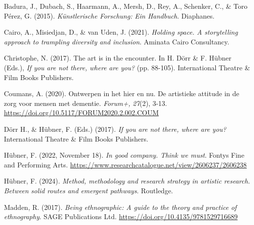 \documentclass[authordate, empirical,issue]{jote-new-article}
\begin{document}
	{

	Badura, J., Dubach, S., Haarmann, A., Mersh, D., Rey, A., Schenker, C., \& Toro Pérez, G. (2015). \emph{Künstlerische Forschung: Ein Handbuch}. Diaphanes.







	Cairo, A., Misiedjan, D., \& van Uden, J. (2021). \emph{Holding space. A storytelling approach to trampling diversity and inclusion}. Aminata Cairo Consultancy.







	Christophe, N. (2017). The art is in the encounter. In H. Dörr \& F. Hübner (Eds.), \emph{If you are not there, where are you?} (pp. 88-105). International Theatre \& Film Books Publishers.







	Coumans, A. (2020). Ontwerpen in het hier en nu. De artistieke attitude in de zorg voor mensen met dementie. \emph{Forum+,} \emph{27}(2), 3-13. \url{https://doi.org/10.5117/FORUM2020.2.002.COUM}







	Dörr H., \& Hübner, F. (Eds.) (2017). \emph{If you are not there, where are you?} International Theatre \& Film Books Publishers.







	Hübner, F. (2022, November 18). \emph{In good company. Think we must}. Fontys Fine and Performing Arts. \url{https://www.researchcatalogue.net/view/2606237/2606238}







	Hübner, F. (2024). \emph{Method, methodology and research strategy in artistic research. Between solid routes and emergent pathways}. Routledge.







	Madden, R. (2017). \emph{Being ethnographic: A guide to the theory and practice of ethnography}. SAGE Publications Ltd. \url{https://doi.org/10.4135/9781529716689}

	}
\end{document}
